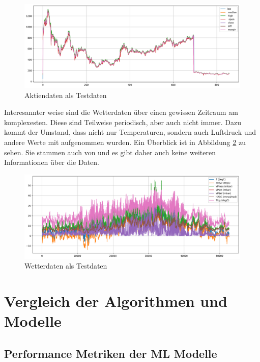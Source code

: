 \begin{figure}[ht]
    \centering
    \includegraphics[width=1\textwidth]{includes/figures/graphs/stockdata.png}
    \caption{Aktiendaten als Testdaten}
    \label{fig:stock_data}
\end{figure}



Interesannter weise sind die Wetterdaten über einen gewissen Zeitraum am komplexesten. Diese sind Teilweise periodisch, aber auch nicht immer. 
Dazu kommt der Umstand, dass nicht nur Temperaturen, sondern auch Luftdruck und andere Werte mit aufgenommen wurden. Ein Überblick ist in Abbildung \ref{fig:weather_data} zu sehen. Sie stammen auch von \cite{longterm99:online} und es gibt daher 
auch keine weiteren Informationen über die Daten.

\begin{figure}[ht]
    \centering
    \includegraphics[width=1\textwidth]{includes/figures/graphs/weather.png}
    \caption{Wetterdaten als Testdaten}
    \label{fig:weather_data}
\end{figure}


\section{Vergleich der Algorithmen und Modelle}

\subsection{Performance Metriken der ML Modelle}

